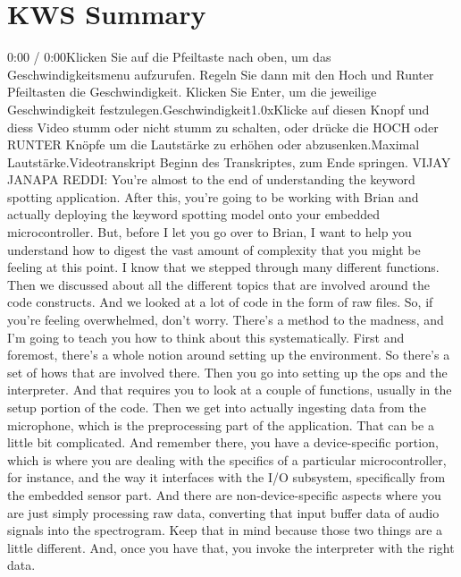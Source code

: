  \section{KWS Summary}
 
     0:00 / 0:00Klicken Sie auf die Pfeiltaste nach oben, um das Geschwindigkeitsmenu aufzurufen. Regeln Sie dann mit den Hoch und Runter Pfeiltasten die Geschwindigkeit. Klicken Sie Enter, um die jeweilige Geschwindigkeit festzulegen.Geschwindigkeit1.0xKlicke auf diesen Knopf und diess Video stumm oder nicht stumm zu schalten, oder drücke die HOCH oder RUNTER Knöpfe um die Lautstärke zu erhöhen oder abzusenken.Maximal Lautstärke.Videotranskript
     Beginn des Transkriptes, zum Ende springen.
     VIJAY JANAPA REDDI: You're almost to the end of understanding
     the keyword spotting application.
     After this, you're going to be working with Brian
     and actually deploying the keyword spotting model
     onto your embedded microcontroller.
     But, before I let you go over to Brian, I
     want to help you understand how to digest the vast amount of complexity
     that you might be feeling at this point.
     I know that we stepped through many different functions.
     Then we discussed about all the different topics
     that are involved around the code constructs.
     And we looked at a lot of code in the form of raw files.
     So, if you're feeling overwhelmed, don't worry.
     There's a method to the madness, and I'm going to teach you
     how to think about this systematically.
     First and foremost, there's a whole notion
     around setting up the environment.
     So there's a set of hows that are involved there.
     Then you go into setting up the ops and the interpreter.
     And that requires you to look at a couple of functions,
     usually in the setup portion of the code.
     Then we get into actually ingesting data from the microphone, which
     is the preprocessing part of the application.
     That can be a little bit complicated.
     And remember there, you have a device-specific portion,
     which is where you are dealing with the specifics
     of a particular microcontroller, for instance,
     and the way it interfaces with the I/O subsystem,
     specifically from the embedded sensor part.
     And there are non-device-specific aspects
     where you are just simply processing raw data,
     converting that input buffer data of audio signals into the spectrogram.
     Keep that in mind because those two things are a little different.
     And, once you have that, you invoke the interpreter with the right data.
